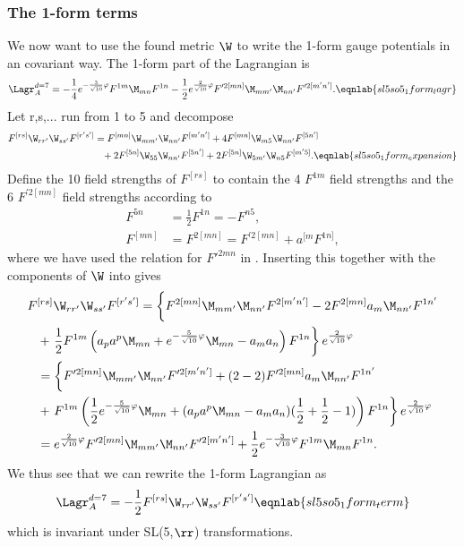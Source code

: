 \subsubsection{The 1-form terms}
We now want to use the found metric $\W$ to write the 1-form gauge potentials in an  covariant way. 
The 1-form part of the Lagrangian  is 
\begin{equation}
\Lagr_{A}^{d=7} = -\frac{1}{4}e^{-\frac{3}{\sqrt{10}}\varphi}F^{1m}\M_{mn}F^{1n}-\frac{1}{2}e^{\frac{2}{\sqrt{10}}\varphi}F'^{2[mn]}\M_{mm'}\M_{nn'}F'^{2[m'n']}.
\eqnlab{sl5so5_1form_lagr}
\end{equation}
Let r,s,... run from 1 to 5 and decompose
\begin{align}
F^{[rs]}\W_{rr'}\W_{ss'}F^{[r's']} &= F^{[mn]}\W_{mm'}\W_{nn'}F^{[m'n']}+4F^{[mn]}\W_{m5}\W_{nn'}F^{[5n']}\nonumber\\
& \phantom{=} +2F^{[5n]}\W_{55}\W_{nn'}F^{[5n']}+2F^{[5n]}\W_{5m'}\W_{n5}F^{[m'5]}.
\eqnlab{sl5so5_1form_expansion}
\end{align}
Define the 10 field strengths of $F^{[rs]}$ to contain the 4 $F^{1m}$ field strengths and the 6 $F^{'2[mn]}$ field strengths according to  
\begin{align}
F^{5n} &= \frac{1}{2}F^{1n} = -F^{n5},\nonumber\\
F^{[mn]} &= F^{2[mn]} = F^{'2[mn]} + a^{[m}F^{1n]},
\label{dsdg}
\end{align}
where we have used the relation for $F'^{2mn}$ in .
Inserting this together with the components of $\W$ into  gives
\begin{align}
F&^{[rs]}\W_{rr'}\W_{ss'}F^{[r's']} = \bigg\{F^{2[mn]}\M_{mm'}\M_{nn'}F^{2[m'n']}-2F^{2[mn]}a_m\M_{nn'}F^{1n'}\nonumber\\ 
&+\left.\frac{1}{2}F^{1m}\left(a_pa^p\M_{mn}+e^{-\frac{5}{\sqrt{10}}\varphi}\M_{mn}-a_ma_n\right)F^{1n}\right\}e^{\frac{2}{\sqrt{10}}\varphi}\nonumber\\
&=\bigg\{F'^{2[mn]}\M_{mm'}\M_{nn'}F'^{2[m'n']}+(2-2)F'^{2[mn]}a_m\M_{nn'}F^{1n'}\nonumber\\ 
&+\left.F^{1m}\left(\frac{1}{2}e^{-\frac{5}{\sqrt{10}}\varphi}\M_{mn}+(a_pa^p\M_{mn}-a_ma_n)(\frac{1}{2}+\frac{1}{2}-1)\right)F^{1n}\right\}e^{\frac{2}{\sqrt{10}}\varphi}\nonumber\\
&=e^{\frac{2}{\sqrt{10}}\varphi}F'^{2[mn]}\M_{mm'}\M_{nn'}F'^{2[m'n']}+\frac{1}{2}e^{-\frac{3}{\sqrt{10}}\varphi}F^{1m}\M_{mn}F^{1n}.
\end{align}
We thus see that we can rewrite the 1-form Lagrangian  as
\begin{equation}
\Lagr_{A}^{d=7} = -\frac{1}{2}F^{[rs]}\W_{rr'}\W_{ss'}F^{[r's']}
\eqnlab{sl5so5_1form_term}
\end{equation}
which is invariant under SL(5,$\rr$) transformations.

